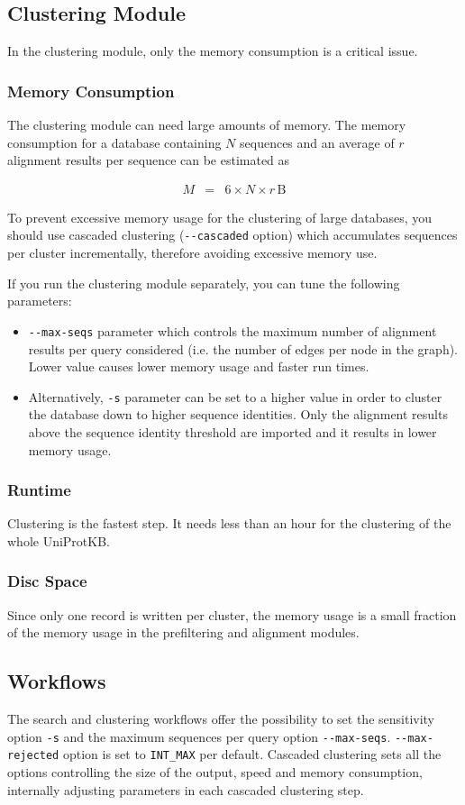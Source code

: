 \documentclass[11pt,a4paper]{scrreprt}
\begin{document}
\subsection{Clustering Module}
In the clustering module, only the memory consumption is a critical issue.
\subsubsection{Memory Consumption}
The clustering module can need large amounts of memory. The memory consumption for a database containing $N$ sequences and an average of $r$ alignment results per sequence can be estimated as

\begin{eqnarray*}
M & = & 6\times N\times r\,\mathrm{B}
\end{eqnarray*}
 
To prevent excessive memory usage for the clustering of large databases, you should use cascaded clustering (\texttt{-{}-cascaded} option) which accumulates sequences per cluster incrementally, therefore avoiding excessive memory use.

If you run the clustering module separately, you can tune the following parameters:
\begin{itemize}
\item \texttt{-{}-max-seqs} parameter which controls the maximum number of alignment results per query considered (i.e. the number of edges per node in the graph). Lower value causes lower memory usage and faster run times.
\item Alternatively, \texttt{-s} parameter can be set to a higher value in order to cluster the database down to higher sequence identities. Only the alignment results above the sequence identity threshold are imported and it results in lower memory usage. 
\end{itemize}
\subsubsection{Runtime}
Clustering is the fastest step. It needs less than an hour for the clustering of the whole UniProtKB. 
\subsubsection{Disc Space}
Since only one record is written per cluster, the memory usage is a small fraction of the memory usage in the prefiltering and alignment modules.
\subsection{Workflows}
The search and clustering workflows offer the possibility to set the sensitivity option \texttt{-s} and the maximum sequences per query option \texttt{-{}-max-seqs}. \texttt{-{}-max-rejected} option is set to \texttt{INT\_MAX} per default. Cascaded clustering sets all the options controlling the size of the output, speed and memory consumption, internally adjusting parameters in each cascaded clustering step.
\end{document}
